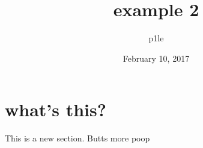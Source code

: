 \documentclass[a4paper, 11pt]{article}
\begin{document}
\title{example 2}
\author{p1le}
\date{February 10, 2017}
\maketitle
\section{what's this?}
This is a new section. Butts
more poop
\end{document}
